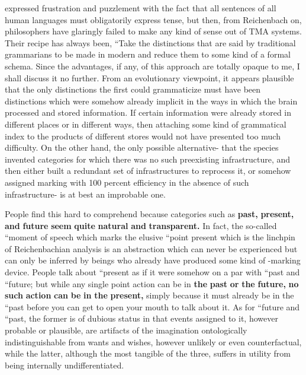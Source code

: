 \citet[170]{Quine1960} expressed frustration and puzzlement with the fact that all sentences of all human languages must obligatorily express tense, but then, from Reichenbach on, philosophers have glaringly failed to make any kind of sense out of TMA systems. Their recipe has always been, ``Take the distinctions that are said by tradi\-tional grammarians to be made in modern  and reduce them to some kind of a formal schema. Since the advantages, if any, of this
approach are totally opaque to me, I shall discuss it no further. From
an evolutionary viewpoint, it appears plausible that the only distinc\-tions the first  could grammaticize must have been dis\-tinctions which were somehow already implicit in the ways in which the brain processed and stored information. If certain  infor\-mation were already stored in different places or in different ways, then attaching some kind of grammatical index to the products of different stores would not have presented too much difficulty. On the other hand, the only possible alternative- that the species invented cate\-gories for which there was no such preexisting infrastructure, and then either built a redundant set of infrastructures to reprocess it, or some\-how assigned marking with 100 percent efficiency in the absence of such infrastructure- is at best an improbable one.

People find this hard to comprehend because categories such as \textbf{{\textquotedbl}past,{\textquotedbl}} \textbf{{\textquotedbl}present,{\textquotedbl}} \textbf{and} \textbf{{\textquotedbl}future{\textquotedbl}} \textbf{seem} \textbf{quite} \textbf{natural} \textbf{and} \textbf{transparent.} In fact, the so-called ``moment of speech which marks the elusive ``point present which is the linchpin of Reichenbachian analysis is an abstraction which can never be experienced but can only be inferred by beings who already have produced some kind of -marking device. People talk about ``present as if it were somehow on a par with ``past and ``future{\textquotedbl}; but while any single point action can be in \textbf{the} \textbf{{\textquotedbl}past{\textquotedbl}} \textbf{or} \textbf{the} \textbf{{\textquotedbl}future,{\textquotedbl}} \textbf{no} \textbf{such} \textbf{action} \textbf{can} \textbf{be} \textbf{in} \textbf{the} \textbf{{\textquotedbl}present,{\textquotedbl}} simply because it must already be in the ``past before you can get  to open your mouth to talk about it. As for ``future and ``past, the former is of dubious status in that events assigned to it, however probable or plausible, are artifacts of the imagination ontologically indistinguishable from wants and wishes, however unlikely or even counterfactual, while the latter, although the most tangible of the three, suffers in utility from being internally undifferentiated.


